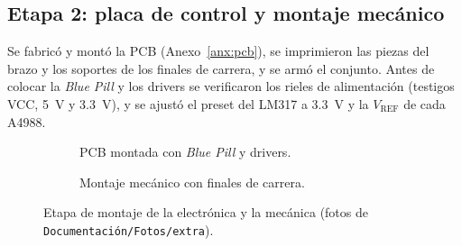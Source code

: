 \subsection{Etapa 2: placa de control y montaje mecánico}
Se fabricó y montó la PCB (Anexo~\ref{anx:pcb}), se imprimieron las piezas del brazo y los
soportes de los finales de carrera, y se armó el conjunto. Antes de colocar la \emph{Blue
Pill} y los drivers se verificaron los rieles de alimentación (testigos VCC, \SI{5}{\volt} y
\SI{3,3}{\volt}), y se ajustó el preset del LM317 a \SI{3,3}{\volt} y la $V_{\mathrm{REF}}$
de cada A4988.

\begin{figure}[!htbp]
\centering
\begin{subfigure}{0.48\textwidth}\centering
  \caption{PCB montada con \emph{Blue Pill} y drivers.}
\end{subfigure}\hfill
\begin{subfigure}{0.48\textwidth}\centering
  \caption{Montaje mecánico con finales de carrera.}
\end{subfigure}
\caption{Etapa de montaje de la electrónica y la mecánica (fotos de \texttt{Documentación/Fotos/extra}).}\label{fig:montaje}
\end{figure}

